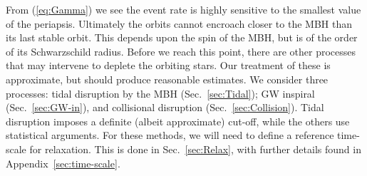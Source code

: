 \documentclass[useAMS,usedcolumn,usegraphicx,usenatbib]{mn2e}
\newcommand{\eqnref}[1]{(\ref{eq:#1})}
\newcommand{\secref}[1]{Sec.~\ref{sec:#1}}
\newcommand{\apref}[1]{Appendix~\ref{sec:#1}}
\begin{document}
From \eqnref{Gamma} we see the event rate is highly sensitive to the smallest value of the periapsis. Ultimately the orbits cannot encroach closer to the MBH than its last stable orbit. This depends upon the spin of the MBH, but is of the order of its Schwarzschild radius. Before we reach this point, there are other processes that may intervene to deplete the orbiting stars. Our treatment of these is approximate, but should produce reasonable estimates. We consider three processes: tidal disruption by the MBH (\secref{Tidal}); GW inspiral (\secref{GW-in}), and collisional disruption (\secref{Collision}). Tidal disruption imposes a definite (albeit approximate) cut-off, while the others use statistical arguments. For these methods, we will need to define a reference time-scale for relaxation. This is done in \secref{Relax}, with further details found in \apref{time-scale}.
\end{document}
